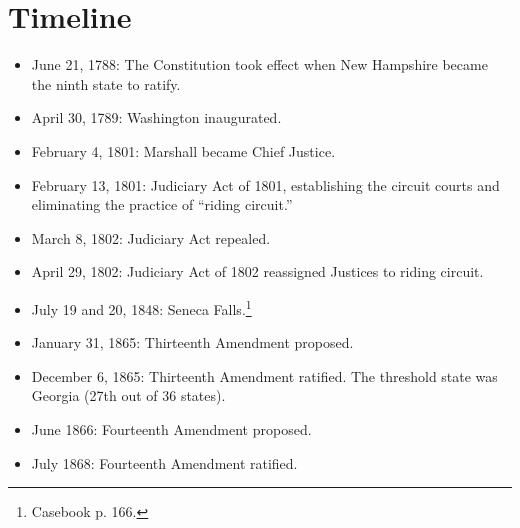 \section{Timeline}

\begin{itemize}
    \item June 21, 1788: The Constitution took effect when New Hampshire 
    became the ninth state to ratify.
    \item April 30, 1789: Washington inaugurated.
    \item February 4, 1801: Marshall became Chief Justice.
    \item February 13, 1801: Judiciary Act of 1801, establishing the circuit 
    courts and eliminating the practice of ``riding circuit.''
    \item March 8, 1802: Judiciary Act repealed.
    \item April 29, 1802: Judiciary Act of 1802 reassigned Justices to riding 
    circuit.
    \item July 19 and 20, 1848: Seneca Falls.\footnote{Casebook p. 166.}
    \item January 31, 1865: Thirteenth Amendment proposed.
    \item December 6, 1865: Thirteenth Amendment ratified. The threshold state 
    was Georgia (27th out of 36 states).
    \item June 1866: Fourteenth Amendment proposed.
    \item July 1868: Fourteenth Amendment ratified.
\end{itemize}
